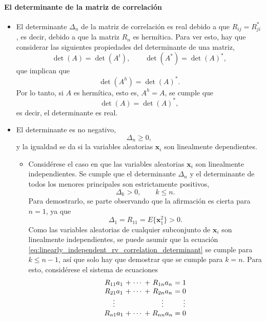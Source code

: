 \documentclass[a4paper]{report}
\newcommand{\x}{\mathbf{x}}
\begin{document}
\paragraph{El determinante de la matriz de correlación}
\begin{itemize}
 \item El determinante \(\Delta_n\) de la matriz de correlación es real debido a que \(R_{ij}=R_{ji}^*\), es decir, debido a que la matriz \(R_n\) es hermítica. Para ver esto, hay que considerar las siguientes propiedades del determinante de una matriz,
 \[
  \det(A)=\det\left(A^t\right),\qquad \det\left(A^*\right)=\det(A)^*,
 \]
 que implican que
 \[
  \det\left(A^h\right)=\det(A)^*.
 \]
 Por lo tanto, si \(A\) es hermítica, esto es, \(A^h=A\), se cumple que
 \[
  \det(A)=\det(A)^*,
 \]
 es decir, el determinante es real.
 \item El determinante es no negativo,
 \[
  \Delta_n\geq0,
 \]
 y la igualdad se da si la variables aleatorias \(\x_i\) son linealmente dependientes.
 \begin{itemize}
  \item Considérese el caso en que las variables aleatorias \(\x_i\) son linealmente independientes. Se cumple que el determinante \(\Delta_n\) y el determinante de todos los menores principales son estrictamente positivos,
  \begin{equation}\label{eq:linearly_independent_rv_correlation_determinant}
   \Delta_k>0,\qquad k\leq n.
  \end{equation}
  Para demostrarlo, se parte observando que la afirmación es cierta para \(n=1\), ya que
  \[
   \Delta_1=R_{11}=E\{\x_1^2\}>0.
  \]
  Como las variables aleatorias de cualquier subconjunto de \(\x_i\) son linealmente independientes, se puede asumir que la ecuación \ref{eq:linearly_independent_rv_correlation_determinant} se cumple para \(k\leq n-1\), así que solo hay que demostrar que se cumple para \(k=n\). Para esto, considérese el sistema de ecuaciones
  \begin{equation}\label{eq:linearly_independent_rv_correlation_determinant_deduction1}
   \arraycolsep=1.4pt
  \begin{array}{ccccccc}
    R_{11}a_1&+&\cdots&+&R_{1n}a_n&=&1\\
    R_{21}a_1&+&\cdots&+&R_{2n}a_n&=&0\\
    \vdots& & & &\vdots& &\vdots\\
    R_{n1}a_1&+&\cdots&+&R_{nn}a_n&=&0
  \end{array}
  \end{equation}

\end{itemize}
\end{itemize}
\end{document}
